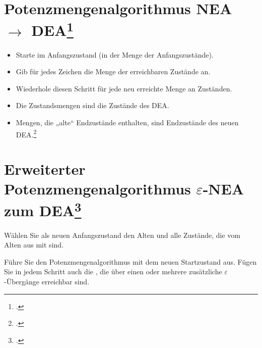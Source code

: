 \documentclass{lehramt-informatik-haupt}
\begin{document}

%

\section{Potenzmengenalgorithmus NEA $\rightarrow$ DEA\footcite[Seite 35-47]{theo:fs:1}}

\begin{itemize}
\item Starte im Anfangszustand (in der Menge der Anfangszustände).

\item Gib für jedes Zeichen die Menge der erreichbaren Zustände an.

\item Wiederhole diesen Schritt für jede neu erreichte Menge an
Zuständen.

\item Die Zustandsmengen sind die Zustände des DEA.

\item Mengen, die „alte“ Endzustände enthalten, sind Endzustände des
neuen DEA.\footcite{wiki:potenzmengenkonstruktion}
\end{itemize}

%

\section{Erweiterter Potenzmengenalgorithmus $\varepsilon$-NEA zum
DEA\footcite[Seite 48-49]{theo:fs:1}}

Wählen Sie als neuen Anfangszustand den Alten und alle Zustände, die vom
Alten aus mit  sind.

Führe Sie den Potenzmengenalgorithmus mit dem neuen Startzustand aus.
Fügen Sie in jedem Schritt auch die , die über
einen oder mehrere zusätzliche $\varepsilon$-Übergänge erreichbar sind.

\literatur
\end{document}
